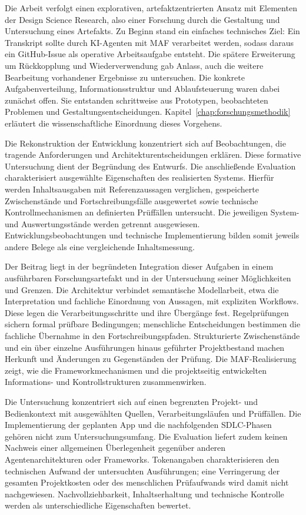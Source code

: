 Die Arbeit verfolgt einen explorativen, artefaktzentrierten Ansatz mit
Elementen der Design Science Research, also einer Forschung durch die
Gestaltung und Untersuchung eines Artefakts. Zu Beginn stand ein
einfaches technisches Ziel: Ein Transkript sollte durch KI-Agenten mit
MAF verarbeitet werden, sodass daraus ein GitHub-Issue als operative
Arbeitsaufgabe entsteht. Die spätere Erweiterung um Rückkopplung und
Wiederverwendung gab Anlass, auch die weitere Bearbeitung vorhandener
Ergebnisse zu untersuchen. Die konkrete Aufgabenverteilung,
Informationsstruktur und Ablaufsteuerung waren dabei zunächst offen.
Sie entstanden schrittweise aus Prototypen, beobachteten Problemen und
Gestaltungsentscheidungen. Kapitel~\ref{chap:forschungsmethodik}
erläutert die wissenschaftliche Einordnung dieses Vorgehens.

Die Rekonstruktion der Entwicklung konzentriert sich auf Beobachtungen,
die tragende Anforderungen und Architekturentscheidungen erklären.
Diese formative Untersuchung dient der Begründung des Entwurfs.
Die anschließende Evaluation charakterisiert ausgewählte Eigenschaften
des realisierten Systems. Hierfür werden Inhaltsausgaben mit
Referenzaussagen verglichen, gespeicherte Zwischenstände und
Fortschreibungsfälle ausgewertet sowie technische Kontrollmechanismen
an definierten Prüffällen untersucht. Die jeweiligen System- und
Auswertungsstände werden getrennt ausgewiesen. Entwicklungsbeobachtungen
und technische Implementierung bilden somit jeweils andere Belege als
eine vergleichende Inhaltsmessung.

Der Beitrag liegt in der begründeten Integration dieser Aufgaben in
einem ausführbaren Forschungsartefakt und in der Untersuchung seiner
Möglichkeiten und Grenzen. Die Architektur verbindet semantische
Modellarbeit, etwa die Interpretation und fachliche Einordnung von
Aussagen, mit expliziten Workflows. Diese legen die Verarbeitungsschritte
und ihre Übergänge fest. Regelprüfungen sichern formal prüfbare
Bedingungen; menschliche Entscheidungen bestimmen die fachliche
Übernahme in den Fortschreibungspfaden. Strukturierte Zwischenstände
und ein über einzelne Ausführungen hinaus geführter Projektbestand
machen Herkunft und Änderungen zu Gegenständen der Prüfung.
Die MAF-Realisierung zeigt, wie die Frameworkmechanismen und die
projektseitig entwickelten Informations- und Kontrollstrukturen
zusammenwirken.

Die Untersuchung konzentriert sich auf einen begrenzten Projekt- und
Bedienkontext mit ausgewählten Quellen, Verarbeitungsläufen und
Prüffällen. Die Implementierung der geplanten App und die nachfolgenden
SDLC-Phasen gehören nicht zum Untersuchungsumfang. Die Evaluation
liefert zudem keinen Nachweis einer allgemeinen Überlegenheit gegenüber
anderen Agentenarchitekturen oder Frameworks. Tokenangaben
charakterisieren den technischen Aufwand der untersuchten Ausführungen;
eine Verringerung der gesamten Projektkosten oder des menschlichen
Prüfaufwands wird damit nicht nachgewiesen. Nachvollziehbarkeit,
Inhaltserhaltung und technische Kontrolle werden als unterschiedliche
Eigenschaften bewertet.

